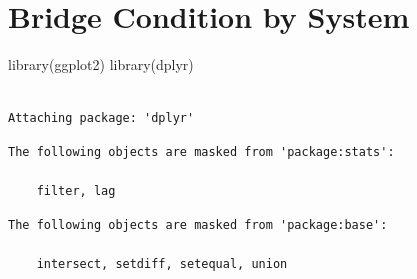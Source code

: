 \documentclass[
  letterpaper,
  DIV=11,
  numbers=noendperiod]{scrreprt}
\newenvironment{Shaded}{\begin{snugshade}}{\end{snugshade}}
\newcommand{\FunctionTok}[1]{\textcolor[rgb]{0.28,0.35,0.67}{#1}}
\newcommand{\NormalTok}[1]{\textcolor[rgb]{0.00,0.23,0.31}{#1}}
\begin{document}
\section{Bridge Condition by System}\label{bridge-condition-by-system-1}

\begin{Shaded}
\begin{Highlighting}[]
\FunctionTok{library}\NormalTok{(ggplot2)}
\FunctionTok{library}\NormalTok{(dplyr)}
\end{Highlighting}
\end{Shaded}

\begin{verbatim}

Attaching package: 'dplyr'
\end{verbatim}

\begin{verbatim}
The following objects are masked from 'package:stats':

    filter, lag
\end{verbatim}

\begin{verbatim}
The following objects are masked from 'package:base':

    intersect, setdiff, setequal, union
\end{verbatim}
\end{document}
